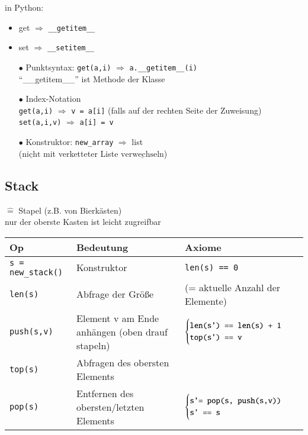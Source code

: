    in Python:
    \begin{itemize}[label={}]
        \item get $\Rightarrow$ \verb|__getitem__|
        \item set $\Rightarrow$ \verb|__setitem__|
        \item[$\bullet$] Punktsyntax: \verb|get(a,i)| $\Rightarrow$ \verb|a.__getitem__(i)| \\
        ``\_\_getitem\_\_'' ist Methode der Klasse
        \item[$\bullet$] Index-Notation \\
        \verb|get(a,i)| $\Rightarrow$ \verb|v = a[i]| (falls auf der rechten Seite der Zuweisung) \\
        \verb|set(a,i,v)| $\Rightarrow$ \verb|a[i] = v|
        \item[$\bullet$] Konstruktor: \verb|new_array| $\Rightarrow$ list \\
        ($\underline{\text{nicht}}$ mit verketteter Liste $\underline{\text{verwechseln}}$)
    \end{itemize}

    \subsection{Stack}
    $\widehat{=}$ Stapel (z.B. von Bierkästen) \\
    nur der oberste Kasten ist leicht zugreifbar \\

    \begin{tabular}{C{5cm} C{5cm} C{5cm}}
        Op & Bedeutung & Axiome \\ \hline
        \verb|s = new_stack()| & Konstruktor & \verb|len(s) == 0| \\
        \verb|len(s)| & Abfrage der Größe & (= aktuelle Anzahl der Elemente) \\
        \verb|push(s,v)| & Element v am Ende anhängen (oben drauf stapeln) & $\begin{cases}
        \verb|len(s') == len(s) + 1| \\
        \verb|top(s') == v|
        \end{cases}$ \\
        \verb|top(s)| & Abfragen des obersten Elements & \\
        \verb|pop(s)| & Entfernen des obersten/letzten Elements & $\begin{cases}
        \verb|s'= pop(s, push(s,v))| \\
        \verb|s' == s| \end{cases}$ \\
    \end{tabular} \\

